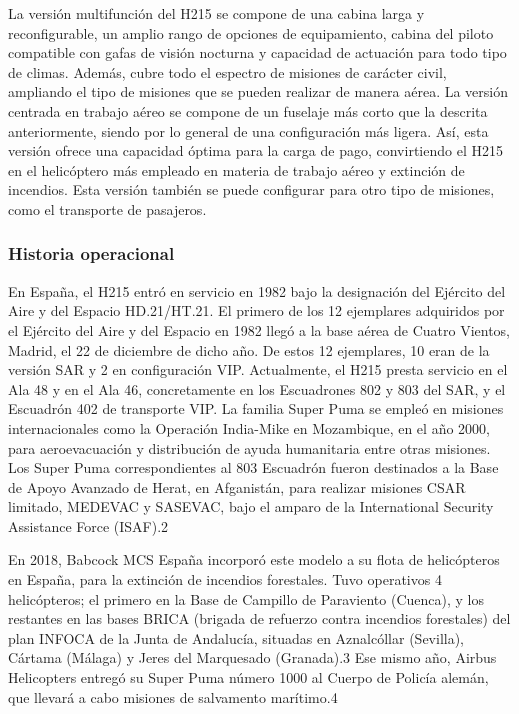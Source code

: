 La versión multifunción del H215 se compone de una cabina larga y reconfigurable, un amplio rango de opciones de equipamiento, cabina del piloto compatible con gafas de visión nocturna y capacidad de actuación para todo tipo de climas. Además, cubre todo el espectro de misiones de carácter civil, ampliando el tipo de misiones que se pueden realizar de manera aérea. La versión centrada en trabajo aéreo se compone de un fuselaje más corto que la descrita anteriormente, siendo por lo general de una configuración más ligera. Así, esta versión ofrece una capacidad óptima para la carga de pago, convirtiendo el H215 en el helicóptero más empleado en materia de trabajo aéreo y extinción de incendios. Esta versión también se puede configurar para otro tipo de misiones, como el transporte de pasajeros. 
\subsubsection{Historia operacional}
En España, el H215 entró en servicio en 1982 bajo la designación del Ejército del Aire y del Espacio HD.21/HT.21. El primero de los 12 ejemplares adquiridos por el Ejército del Aire y del Espacio en 1982 llegó a la base aérea de Cuatro Vientos, Madrid, el 22 de diciembre de dicho año. De estos 12 ejemplares, 10 eran de la versión SAR y 2 en configuración VIP. Actualmente, el H215 presta servicio en el Ala 48 y en el Ala 46, concretamente en los Escuadrones 802 y 803 del SAR, y el Escuadrón 402 de transporte VIP. La familia Super Puma se empleó en misiones internacionales como la Operación India-Mike en Mozambique, en el año 2000, para aeroevacuación y distribución de ayuda humanitaria entre otras misiones. Los Super Puma correspondientes al 803 Escuadrón fueron destinados a la Base de Apoyo Avanzado de Herat, en Afganistán, para realizar misiones CSAR limitado, MEDEVAC y SASEVAC, bajo el amparo de la International Security Assistance Force (ISAF).2​


En 2018, Babcock MCS España incorporó este modelo a su flota de helicópteros en España, para la extinción de incendios forestales. Tuvo operativos 4 helicópteros; el primero en la Base de Campillo de Paraviento (Cuenca), y los restantes en las bases BRICA (brigada de refuerzo contra incendios forestales) del plan INFOCA de la Junta de Andalucía, situadas en Aznalcóllar (Sevilla), Cártama (Málaga) y Jeres del Marquesado (Granada).3​ Ese mismo año, Airbus Helicopters entregó su Super Puma número 1000 al Cuerpo de Policía alemán, que llevará a cabo misiones de salvamento marítimo.4
